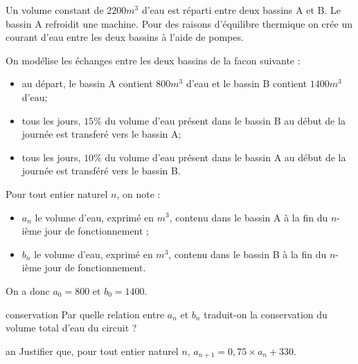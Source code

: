 \documentclass[a4paper]{article}
\def\barQ{b=1,m=-0.1}
\begin{document}
{{	
	
\vspace{2ex}


Un volume constant de $2200 m^3$ d’eau est réparti entre deux bassins A et B. Le bassin A refroidit une machine.
Pour des raisons d’équilibre thermique on crée un courant d’eau entre les deux bassins à l’aide de pompes.\vspace{1ex}

On modélise les échanges entre les deux bassins de la facon suivante :
\begin{itemize}
   \item au départ, le bassin A contient $800 m^3$ d’eau et le bassin B contient $1400 m^3$ d’eau;
   \item tous les jours, $15\%$ du volume d’eau présent dans le bassin B au début de la journée est transferé vers le bassin A;
   \item tous les jours, $10\%$ du volume d’eau présent dans le bassin A au début de la journée est transféré vers le bassin B.\vspace{1ex}
\end{itemize}

Pour tout entier naturel $n$, on note :
\begin{itemize}
   \item $a_{n}$ le volume d’eau, exprimé en $m^3$, contenu dans le bassin A à la fin du $n$-ième jour de fonctionnement ;
   \item $b_{n}$ le volume d’eau, exprimé en $m^3$, contenu dans le bassin B à la fin du $n$-ième jour de fonctionnement.\vspace{1ex}
\end{itemize}

On a donc $a_0 = 800$ et $b_0 = 1400$.


\vspace{2ex}

\begin{question}{conservation}\bareme{\barQ}
Par quelle relation entre $a_n$ et $b_n$ traduit-on la conservation du volume total d’eau du circuit ?
\end{question}

\begin{question}{an}\bareme{\barQ}
Justifier que, pour tout entier naturel $n$, $a_{n+1} = 0, 75 \times a_n + 330$.
\end{question}


}}
\end{document}
